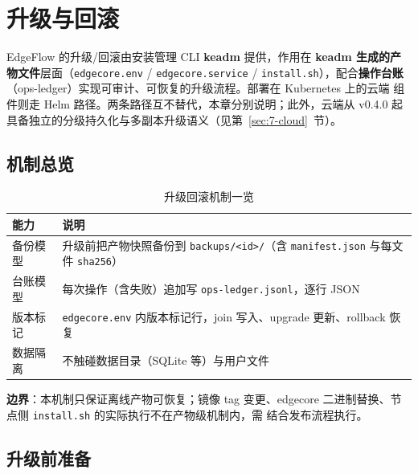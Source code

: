 \chapter{升级与回滚}
\label{ch:7}

EdgeFlow 的升级/回滚由安装管理 CLI \textbf{keadm} 提供，作用在
\textbf{keadm 生成的产物文件}层面（\texttt{edgecore.env} /
\texttt{edgecore.service} / \texttt{install.sh}），配合\textbf{操作台账}
（ops-ledger）实现可审计、可恢复的升级流程。部署在 Kubernetes 上的云端
组件则走 Helm 路径。两条路径互不替代，本章分别说明；此外，云端从
v0.4.0 起具备独立的分级持久化与多副本升级语义（见第~\ref{sec:7-cloud}~节）。

\section{机制总览}

\begin{table}[htbp]
\centering
\caption{升级回滚机制一览}
\label{tab:7-overview}
\begin{tabularx}{\textwidth}{l X}
\toprule
\textbf{能力} & \textbf{说明} \\
\midrule
备份模型 & 升级前把产物快照备份到 \texttt{backups/<id>/}（含
\texttt{manifest.json} 与每文件 \texttt{sha256}） \\
台账模型 & 每次操作（含失败）追加写 \texttt{ops-ledger.jsonl}，逐行 JSON \\
版本标记 & \texttt{edgecore.env} 内版本标记行，join 写入、upgrade 更新、rollback 恢复 \\
数据隔离 & 不触碰数据目录（SQLite 等）与用户文件 \\
\bottomrule
\end{tabularx}
\end{table}

\textbf{边界}：本机制只保证离线产物可恢复；镜像 tag 变更、edgecore
二进制替换、节点侧 \texttt{install.sh} 的实际执行不在产物级机制内，需
结合发布流程执行。

\section{升级前准备}


